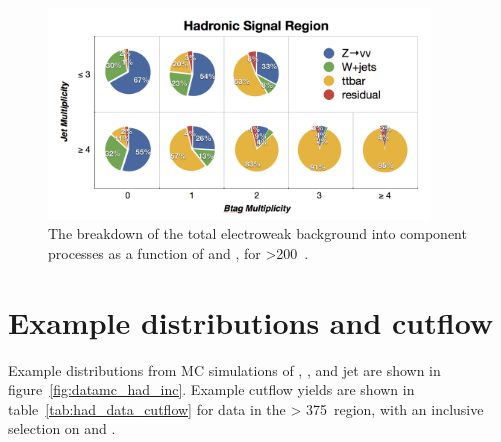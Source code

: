 \begin{figure}[t]
\centering
\hspace{0cm}\includegraphics[width=0.9\textwidth, trim=0 00 0 0, clip=true]
{Figs/ra1_had_bg_comp_v3.png}
\caption{The breakdown of the total electroweak background into component
processes as a function of \nj and \nb, for \HT>200~\gev.}
\label{fig:background_decomp}
\end{figure}

\section{Example distributions and cutflow}

Example distributions from MC simulations of \alphat, \HT, \mht and jet \Pt  are
shown in figure~\ref{fig:datamc_had_inc}. Example cutflow yields are shown in
table~\ref{tab:had_data_cutflow} for data in the \HT > 375~\gev region, with an
inclusive selection on \nj and \nb.


